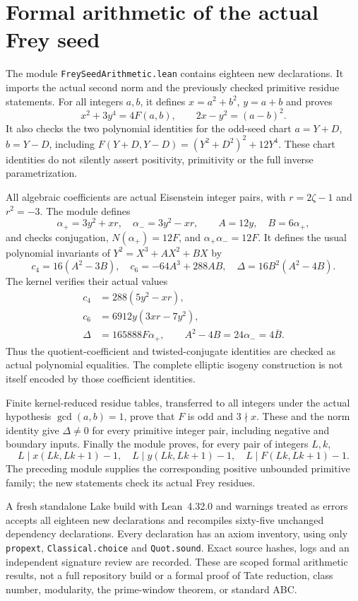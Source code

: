 \section{Formal arithmetic of the actual Frey seed}
\label{sec:formal-frey-seed}

The module \texttt{FreySeedArithmetic.lean} contains eighteen new
declarations. It imports the actual second norm and the previously
checked primitive residue statements. For all integers $a,b$, it defines
$x=a^2+b^2$, $y=a+b$ and proves
\[
 x^2+3y^4=4F(a,b),\qquad 2x-y^2=(a-b)^2.
\]
It also checks the two polynomial identities for the odd-seed chart
$a=Y+D$, $b=Y-D$, including
$F(Y+D,Y-D)=(Y^2+D^2)^2+12Y^4$. These chart identities do not silently
assert positivity, primitivity or the full inverse parametrization.

All algebraic coefficients are actual Eisenstein integer pairs, with
$r=2\zeta-1$ and $r^2=-3$. The module defines
\[
 \alpha_+=3y^2+xr,\quad \alpha_-=3y^2-xr,
 \qquad A=12y,\quad B=6\alpha_+,
\]
and checks conjugation, $N(\alpha_+)=12F$, and
$\alpha_+\alpha_-=12F$. It defines the usual polynomial invariants of
$Y^2=X^3+AX^2+BX$ by
\[
 c_4=16(A^2-3B),\quad c_6=-64A^3+288AB,
 \quad\Delta=16B^2(A^2-4B).
\]
The kernel verifies their actual values
\[
 \begin{split}
 c_4&=288(5y^2-xr),\\
 c_6&=6912y(3xr-7y^2),\\
 \Delta&=165888F\alpha_+,
 \qquad A^2-4B=24\alpha_-=4\overline B.
 \end{split}
\]
Thus the quotient-coefficient and twisted-conjugate identities are checked
as actual polynomial equalities. The complete elliptic isogeny construction
is not itself encoded by those coefficient identities.

Finite kernel-reduced residue tables, transferred to all integers under
the actual hypothesis $\gcd(a,b)=1$, prove that $F$ is odd and
$3\nmid x$. These and the norm identity give $\Delta\ne0$ for every
primitive integer pair, including negative and boundary inputs. Finally
the module proves, for every pair of integers $L,k$,
\[
 L\mid x(Lk,Lk+1)-1,\quad L\mid y(Lk,Lk+1)-1,
 \quad L\mid F(Lk,Lk+1)-1.
\]
The preceding module supplies the corresponding positive unbounded
primitive family; the new statements check its actual Frey residues.

A fresh standalone Lake build with Lean~4.32.0 and warnings treated as
errors accepts all eighteen new declarations and recompiles sixty-five
unchanged dependency declarations. Every declaration has an axiom
inventory, using only \texttt{propext}, \texttt{Classical.choice} and
\texttt{Quot.sound}. Exact source hashes, logs and an independent signature
review are recorded. These are scoped formal arithmetic results, not a
full repository build or a formal proof of Tate reduction, class number,
modularity, the prime-window theorem, or standard ABC.

